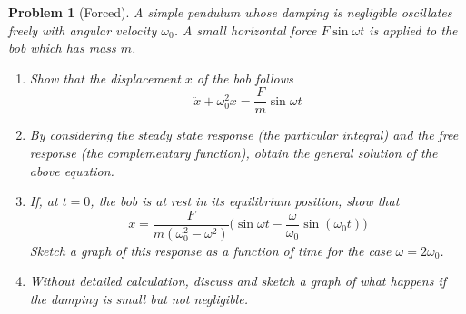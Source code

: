 \documentclass[a4paper]{article}
\theoremstyle{new}
\newtheorem{qns}{Problem}[section]
\begin{document}
\begin{qns}[Forced]
A simple pendulum whose damping is negligible oscillates freely with angular velocity $\omega_0$. A small horizontal force $F\sin\omega t$ is applied to the bob which has mass $m$.
\begin{enumerate}[label=(\alph*)]
    \item Show that the displacement $x$ of the bob follows
    $$\ddot{x}+\omega_0^2x=\frac{F}{m}\sin\omega t$$
    \item By considering the steady state response (the particular integral) and the free response (the complementary function), obtain the general solution of the above equation.
    \item If, at $t = 0$, the bob is at rest in its equilibrium position, show that
    $$x=\frac{F}{m(\omega_0^2-\omega^2)}\bigg(\sin\omega t-\frac{\omega}{\omega_0}\sin(\omega_0t)\bigg)$$
    Sketch a graph of this response as a function of time for the case $\omega=2\omega_0$.
    \item Without detailed calculation, discuss and sketch a graph of what happens if the damping is
small but not negligible.
\end{enumerate}
\end{qns}
\end{document}
